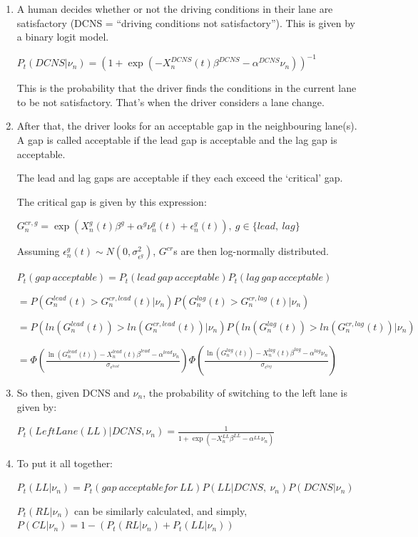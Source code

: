 \begin{enumerate}

\item

A human decides whether or not the driving conditions in their lane are satisfactory (DCNS = “driving conditions not satisfactory”). This is given by a binary logit model.

$P_t(DCNS | \nu_n) = (1 + \exp(-X_n^{DCNS}(t)\beta^{DCNS} - \alpha^{DCNS}\nu_n)) ^ {-1}$

This is the probability that the driver finds the conditions in the current lane to be not satisfactory. That’s when the driver considers a lane change. 


\item

After that, the driver looks for an acceptable gap in the neighbouring lane(s). A gap is called acceptable if the lead gap is acceptable and the lag gap is acceptable. 

The lead and lag gaps are acceptable if they each exceed the ‘critical’ gap.

The critical gap is given by this expression:

$G_n^{cr, g} = \exp(X_n^g(t)\beta^g + \alpha^g\nu_n^g(t) + \epsilon_n^g(t)), \ g \in \{lead,\ lag\}$

Assuming $\epsilon^g_n(t) \sim N(0, \sigma_{\epsilon^g}^2)$, $G^{cr}$s are then log-normally distributed.

$P_t(gap\ acceptable) = P_t(lead\ gap\ acceptable) P_t(lag\ gap\ acceptable)$

 	$ = P(G^{lead}_n(t) > G^{cr, lead}_n(t) | \nu_n) P(G^{lag}_n(t) > G^{cr, lag}_n(t) | \nu_n) $


$ = P(ln(G^{lead}_n(t)) > ln(G^{cr, lead}_n(t)) | \nu_n) P(ln(G^{lag}_n(t)) > ln(G^{cr, lag}_n(t)) | \nu_n) $

$  = \Phi\left(
   \frac{
       \ln(G^{lead}_n(t)) - X_n^{lead}(t)\beta^{lead} - \alpha^{lead}\nu_n
   }{
       \sigma_{\epsilon^{lead}}
   }
\right)
\Phi\left(
   \frac{
       \ln(G^{lag}_n(t)) - X_n^{lag}(t)\beta^{lag} - \alpha^{lag}\nu_n
   }{
       \sigma_{\epsilon^{lag}}
   }
\right)
         $

\item
So then, given DCNS and $\nu_n$, the probability of switching to the left lane is given by:

         $ P_t(Left Lane (LL) | DCNS, \nu_n) = \frac{1}{1 + \exp(-X_n^{LL}\beta^{LL} - \alpha^{LL}\nu_n)} $

\item
To put it all together:	

            $ P_t(LL | \nu_n) = P_t(gap\ acceptable for\ LL) P(LL | DCNS,\ \nu_n) P(DCNS | \nu_n) $

        $P_t(RL | \nu_n)$ can be similarly calculated, and simply, $P(CL | \nu_n) = 1 - (P_t(RL | \nu_n) + P_t(LL | \nu_n))$

\end{enumerate}

